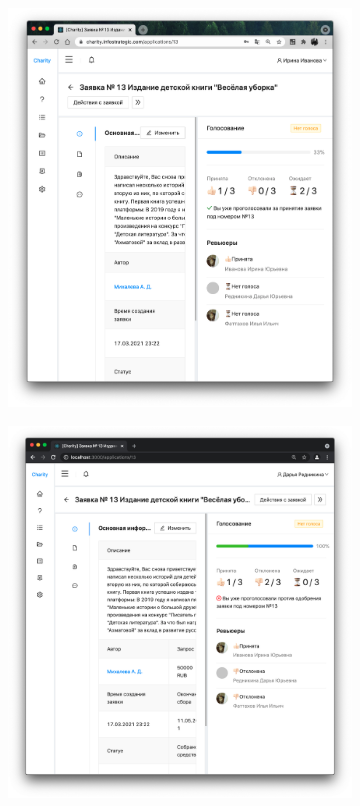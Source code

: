\documentclass[a4paper,12pt,reqno]{article}
\begin{document}
\begin{figure}[H]
\begin{subfigure}[b]{0.475\linewidth}
			\includegraphics[width=\linewidth]{img/ro/vote_for.png}
		\end{subfigure}
		\begin{subfigure}[b]{0.475\linewidth}
			\includegraphics[width=\linewidth]{img/ro/vote_against.png}

\end{subfigure}
\end{figure}
\end{document}
